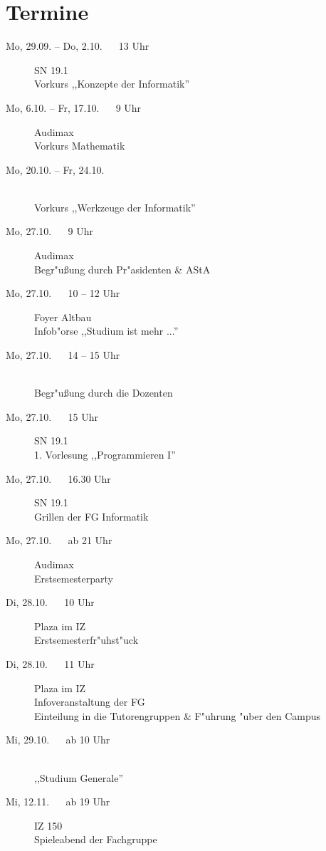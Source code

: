 \section{Termine}

\begin{description}
  \item[Mo, 29.09. -- Do, 2.10. ~~ 13 Uhr] \hfill SN 19.1 \\
  Vorkurs ,,Konzepte der Informatik''
  \item[Mo, 6.10. -- Fr, 17.10. ~~ 9 Uhr] \hfill Audimax \\
  Vorkurs Mathematik
  \item[Mo, 20.10. -- Fr, 24.10.] \ \\
  Vorkurs ,,Werkzeuge der Informatik''
  \item[Mo, 27.10. ~~ 9 Uhr] \hfill Audimax \\
  Begr"u\ss ung durch Pr"asidenten \& AStA
  \item[Mo, 27.10. ~~ 10 -- 12 Uhr] \hfill Foyer Altbau \\
  Infob"orse ,,Studium ist mehr ...''
  \item[Mo, 27.10. ~~ 14 -- 15 Uhr] \ \\
  Begr"u\ss ung durch die Dozenten
  \item[Mo, 27.10. ~~ 15 Uhr] SN 19.1 \\
  1. Vorlesung ,,Programmieren I''
  \item[Mo, 27.10. ~~ 16.30 Uhr] SN 19.1 \\
  Grillen der FG Informatik
  \item[Mo, 27.10. ~~ ab 21 Uhr] \hfill Audimax \\
  Erstsemesterparty
  \item[Di, 28.10. ~~ 10 Uhr] \hfill Plaza im IZ \\
  Erstsemesterfr"uhst"uck
  \item[Di, 28.10. ~~ 11 Uhr] \hfill Plaza im IZ \\
  Infoveranstaltung der FG \\
  Einteilung in die Tutorengruppen \& F"uhrung "uber den Campus
  \item[Mi, 29.10. ~~ ab 10 Uhr] \ \\
  ,,Studium Generale''
  \item[Mi, 12.11. ~~ ab 19 Uhr] \hfill IZ 150 \\
  Spieleabend der Fachgruppe
\end{description}

